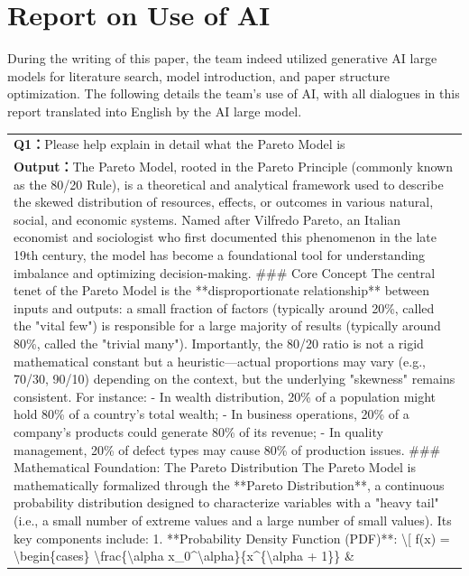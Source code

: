 \hypertarget{report-on-use-of-ai}{%
\section{Report on Use of AI}\label{report-on-use-of-ai}}

During the writing of this paper, the team indeed utilized generative AI
large models for literature search, model introduction, and paper
structure optimization. The following details the team's use of AI, with
all dialogues in this report translated into English by the AI large
model.

\begin{longtable}[]{@{}l@{}}
\toprule
\endhead
\textbf{Q1：}Please help explain in detail what the Pareto Model is \\
\textbf{Output：}The Pareto Model, rooted in the Pareto Principle
(commonly known as the 80/20 Rule), is a theoretical and analytical
framework used to describe the skewed distribution of resources,
effects, or outcomes in various natural, social, and economic systems.
Named after Vilfredo Pareto, an Italian economist and sociologist who
first documented this phenomenon in the late 19th century, the model has
become a foundational tool for understanding imbalance and optimizing
decision-making. \#\#\# Core Concept The central tenet of the Pareto
Model is the **disproportionate relationship** between inputs and
outputs: a small fraction of factors (typically around 20\%, called the
"vital few") is responsible for a large majority of results (typically
around 80\%, called the "trivial many"). Importantly, the 80/20 ratio is
not a rigid mathematical constant but a heuristic---actual proportions
may vary (e.g., 70/30, 90/10) depending on the context, but the
underlying "skewness" remains consistent. For instance: - In wealth
distribution, 20\% of a population might hold 80\% of a country's total
wealth; - In business operations, 20\% of a company's products could
generate 80\% of its revenue; - In quality management, 20\% of defect
types may cause 80\% of production issues. \#\#\# Mathematical
Foundation: The Pareto Distribution The Pareto Model is mathematically
formalized through the **Pareto Distribution**, a continuous probability
distribution designed to characterize variables with a "heavy tail"
(i.e., a small number of extreme values and a large number of small
values). Its key components include: 1. **Probability Density Function
(PDF)**: \textbackslash{[} f(x) = \textbackslash begin\{cases\}
\textbackslash frac\{\textbackslash alpha
x\_0\^{}\textbackslash alpha\}\{x\^{}\{\textbackslash alpha + 1\}\} \&

\end{longtable}
